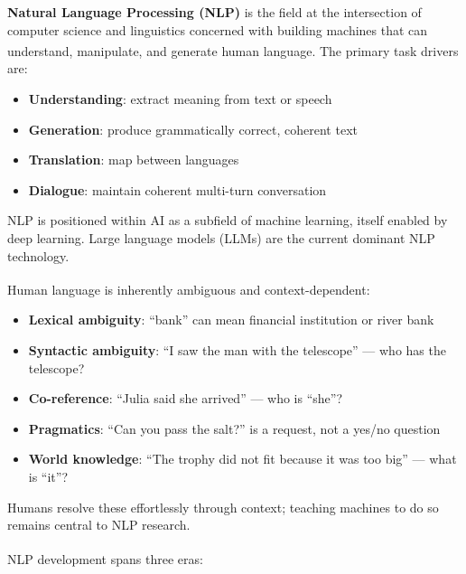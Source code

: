 \begin{tcbitemize}[ skin=sectionraster ]
    \tcbitem[title={Natural Language Processing}, raster multicolumn=3]
    \textbf{Natural Language Processing (NLP)} is the field at the intersection of computer science and linguistics concerned with building machines that can understand, manipulate, and generate human language\textsuperscript{\cite[][p.~3]{dhamaniIntroductionGenerativeAI2024}}.
    The primary task drivers are:
    \begin{itemize}
        \item \textbf{Understanding}: extract meaning from text or speech
        \item \textbf{Generation}: produce grammatically correct, coherent text
        \item \textbf{Translation}: map between languages
        \item \textbf{Dialogue}: maintain coherent multi-turn conversation
    \end{itemize}
    NLP is positioned within AI as a subfield of machine learning, itself enabled by deep learning.
    Large language models (LLMs) are the current dominant NLP technology.

    \tcbitem[title={Core Challenges in NLP}, raster multicolumn=3]
    Human language is inherently ambiguous and context-dependent\textsuperscript{\cite[][p.~9]{dhamaniIntroductionGenerativeAI2024}}:
    \begin{itemize}
        \item \textbf{Lexical ambiguity}: ``bank'' can mean financial institution or river bank
        \item \textbf{Syntactic ambiguity}: ``I saw the man with the telescope'' --- who has the telescope?
        \item \textbf{Co-reference}: ``Julia said she arrived'' --- who is ``she''?
        \item \textbf{Pragmatics}: ``Can you pass the salt?'' is a request, not a yes/no question
        \item \textbf{World knowledge}: ``The trophy did not fit because it was too big'' --- what is ``it''?
    \end{itemize}
    Humans resolve these effortlessly through context; teaching machines to do so remains central to NLP research.

    \tcbitem[title={A Brief History of NLP}, raster multicolumn=6]
    NLP development spans three eras\textsuperscript{\cite[][pp.~3--9]{dhamaniIntroductionGenerativeAI2024}}:


\end{tcbitemize}
